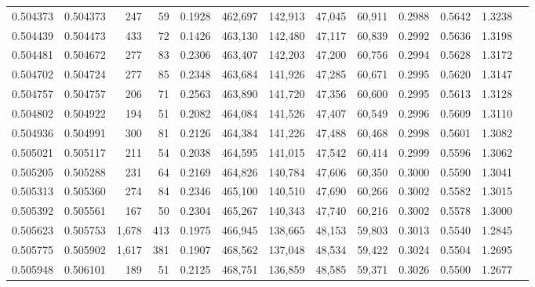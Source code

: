 \begin{tabular}{rrrrrrrrrrrrr}
0.504373 & 0.504373 &   247 &    59 &                                     0.1928 & 462,697 & 142,913 &  47,045 &  60,911 & 0.2988 & 0.5642 & 1.3238 \\
0.504439 & 0.504473 &   433 &    72 &                                     0.1426 & 463,130 & 142,480 &  47,117 &  60,839 & 0.2992 & 0.5636 & 1.3198 \\
0.504481 & 0.504672 &   277 &    83 &                                     0.2306 & 463,407 & 142,203 &  47,200 &  60,756 & 0.2994 & 0.5628 & 1.3172 \\
0.504702 & 0.504724 &   277 &    85 &                                     0.2348 & 463,684 & 141,926 &  47,285 &  60,671 & 0.2995 & 0.5620 & 1.3147 \\
0.504757 & 0.504757 &   206 &    71 &                                     0.2563 & 463,890 & 141,720 &  47,356 &  60,600 & 0.2995 & 0.5613 & 1.3128 \\
0.504802 & 0.504922 &   194 &    51 &                                     0.2082 & 464,084 & 141,526 &  47,407 &  60,549 & 0.2996 & 0.5609 & 1.3110 \\
0.504936 & 0.504991 &   300 &    81 &                                     0.2126 & 464,384 & 141,226 &  47,488 &  60,468 & 0.2998 & 0.5601 & 1.3082 \\
0.505021 & 0.505117 &   211 &    54 &                                     0.2038 & 464,595 & 141,015 &  47,542 &  60,414 & 0.2999 & 0.5596 & 1.3062 \\
0.505205 & 0.505288 &   231 &    64 &                                     0.2169 & 464,826 & 140,784 &  47,606 &  60,350 & 0.3000 & 0.5590 & 1.3041 \\
0.505313 & 0.505360 &   274 &    84 &                                     0.2346 & 465,100 & 140,510 &  47,690 &  60,266 & 0.3002 & 0.5582 & 1.3015 \\
0.505392 & 0.505561 &   167 &    50 &                                     0.2304 & 465,267 & 140,343 &  47,740 &  60,216 & 0.3002 & 0.5578 & 1.3000 \\
0.505623 & 0.505753 & 1,678 &   413 &                                     0.1975 & 466,945 & 138,665 &  48,153 &  59,803 & 0.3013 & 0.5540 & 1.2845 \\
0.505775 & 0.505902 & 1,617 &   381 &                                     0.1907 & 468,562 & 137,048 &  48,534 &  59,422 & 0.3024 & 0.5504 & 1.2695 \\
0.505948 & 0.506101 &   189 &    51 &                                     0.2125 & 468,751 & 136,859 &  48,585 &  59,371 & 0.3026 & 0.5500 & 1.2677 \\

\end{tabular}
